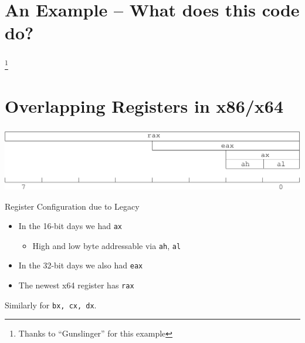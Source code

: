 \documentclass{beamer}
\begin{document}
\section{An Example -- What does this code do?}
\begin{frame}
  \frametitle{\insertsection}

  

  \footnote{Thanks to ``Gunslinger'' for this example}

\end{frame}

\section{Overlapping Registers in x86/x64}

\begin{frame}
  \frametitle{\insertsection}

  \includegraphics[width=\textwidth]{rax}
  \vfill

\begin{block}{Register Configuration due to Legacy}
  \begin{itemize}
    \item In the 16-bit days we had \texttt{ax}
      \begin{itemize}
        \item High and low byte addressable via \texttt{ah}, \texttt{al}
      \end{itemize}
    \item In the 32-bit days we also had \texttt{eax}
    \item The newest x64 register has \texttt{rax}
  \end{itemize}
\end{block}

\begin{center}
Similarly for \texttt{bx, cx, dx}.
\end{center}

\end{frame}
\end{document}
